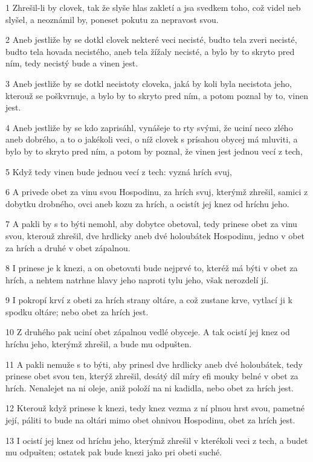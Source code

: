 \par 1 Zhrešil-li by clovek, tak že slyše hlas zakletí a jsa svedkem toho, což videl neb slyšel, a neoznámil by, poneset pokutu za nepravost svou.
\par 2 Aneb jestliže by se dotkl clovek nekteré veci necisté, budto tela zveri necisté, budto tela hovada necistého, aneb tela žížaly necisté, a bylo by to skryto pred ním, tedy necistý bude a vinen jest.
\par 3 Aneb jestliže by se dotkl necistoty cloveka, jaká by koli byla necistota jeho, kterouž se poškvrnuje, a bylo by to skryto pred ním, a potom poznal by to, vinen jest.
\par 4 Aneb jestliže by se kdo zaprisáhl, vynášeje to rty svými, že uciní neco zlého aneb dobrého, a to o jakékoli veci, o níž clovek s prísahou obycej má mluviti, a bylo by to skryto pred ním, a potom by poznal, že vinen jest jednou vecí z tech,
\par 5 Když tedy vinen bude jednou vecí z tech: vyzná hrích svuj,
\par 6 A privede obet za vinu svou Hospodinu, za hrích svuj, kterýmž zhrešil, samici z dobytku drobného, ovci aneb kozu za hrích, a ocistít jej knez od hríchu jeho.
\par 7 A pakli by s to býti nemohl, aby dobytce obetoval, tedy prinese obet za vinu svou, kterouž zhrešil, dve hrdlicky aneb dvé holoubátek Hospodinu, jedno v obet za hrích a druhé v obet zápalnou.
\par 8 I prinese je k knezi, a on obetovati bude nejprvé to, kteréž má býti v obet za hrích, a nehtem natrhne hlavy jeho naproti tylu jeho, však nerozdelí jí.
\par 9 I pokropí krví z obeti za hrích strany oltáre, a což zustane krve, vytlací ji k spodku oltáre; nebo obet za hrích jest.
\par 10 Z druhého pak uciní obet zápalnou vedlé obyceje. A tak ocistí jej knez od hríchu jeho, kterýmž zhrešil, a bude mu odpušten.
\par 11 A pakli nemuže s to býti, aby prinesl dve hrdlicky aneb dvé holoubátek, tedy prinese obet svou ten, kterýž zhrešil, desátý díl míry efi mouky belné v obet za hrích. Nenalejet na ni oleje, aniž položí na ni kadidla, nebo obet za hrích jest.
\par 12 Kterouž když prinese k knezi, tedy knez vezma z ní plnou hrst svou, pametné její, páliti to bude na oltári mimo obet ohnivou Hospodinu, obet za hrích jest.
\par 13 I ocistí jej knez od hríchu jeho, kterýmž zhrešil v kterékoli veci z tech, a budet mu odpušten; ostatek pak bude knezi jako pri obeti suché.
